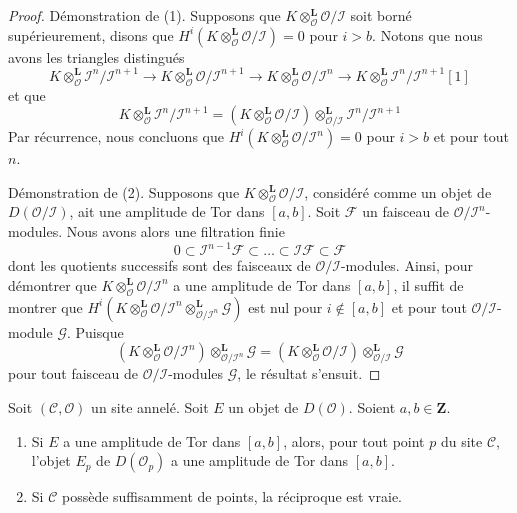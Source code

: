 \begin{proof}
Démonstration de (1). Supposons que
$K \otimes_\mathcal{O}^\mathbf{L} \mathcal{O}/\mathcal{I}$
soit borné supérieurement, disons que
$H^i(K \otimes_\mathcal{O}^\mathbf{L} \mathcal{O}/\mathcal{I}) = 0$
pour $i > b$. Notons que nous avons les triangles distingués
$$
K \otimes_\mathcal{O}^\mathbf{L}
\mathcal{I}^n/\mathcal{I}^{n + 1} \to
K \otimes_\mathcal{O}^\mathbf{L}
\mathcal{O}/\mathcal{I}^{n + 1} \to
K \otimes_\mathcal{O}^\mathbf{L}
\mathcal{O}/\mathcal{I}^n \to
K \otimes_\mathcal{O}^\mathbf{L}
\mathcal{I}^n/\mathcal{I}^{n + 1}[1]
$$
et que
$$
K \otimes_\mathcal{O}^\mathbf{L}
\mathcal{I}^n/\mathcal{I}^{n + 1} =
\left(
K \otimes_\mathcal{O}^\mathbf{L}
\mathcal{O}/\mathcal{I}\right)
\otimes_{\mathcal{O}/\mathcal{I}}^\mathbf{L}
\mathcal{I}^n/\mathcal{I}^{n + 1}
$$
Par récurrence, nous concluons que
$H^i(K \otimes_\mathcal{O}^\mathbf{L} \mathcal{O}/\mathcal{I}^n) = 0$
pour $i > b$ et pour tout $n$.

\medskip\noindent
Démonstration de (2). Supposons que
$K \otimes_\mathcal{O}^\mathbf{L} \mathcal{O}/\mathcal{I}$, considéré comme
un objet de $D(\mathcal{O}/\mathcal{I})$, ait une amplitude de Tor dans
$[a, b]$. Soit $\mathcal{F}$ un faisceau de
$\mathcal{O}/\mathcal{I}^n$-modules. Nous avons alors une filtration finie
$$
0 \subset \mathcal{I}^{n - 1}\mathcal{F} \subset \ldots
\subset \mathcal{I}\mathcal{F} \subset \mathcal{F}
$$
dont les quotients successifs sont des faisceaux de
$\mathcal{O}/\mathcal{I}$-modules. Ainsi, pour démontrer que
$K \otimes_\mathcal{O}^\mathbf{L} \mathcal{O}/\mathcal{I}^n$ a une amplitude
de Tor dans $[a, b]$, il suffit de montrer que
$H^i(K \otimes_\mathcal{O}^\mathbf{L} \mathcal{O}/\mathcal{I}^n
\otimes_{\mathcal{O}/\mathcal{I}^n}^\mathbf{L} \mathcal{G})$
est nul pour $i \not \in [a, b]$ et pour tout
$\mathcal{O}/\mathcal{I}$-module $\mathcal{G}$. Puisque
$$
\left(K \otimes_\mathcal{O}^\mathbf{L} \mathcal{O}/\mathcal{I}^n\right)
\otimes_{\mathcal{O}/\mathcal{I}^n}^\mathbf{L} \mathcal{G}
=
\left(K \otimes_\mathcal{O}^\mathbf{L} \mathcal{O}/\mathcal{I}\right)
\otimes_{\mathcal{O}/\mathcal{I}}^\mathbf{L} \mathcal{G}
$$
pour tout faisceau de $\mathcal{O}/\mathcal{I}$-modules $\mathcal{G}$, le
résultat s'ensuit.
\end{proof}

\begin{lemma}
\label{lemma-tor-amplitude-stalk}
Soit $(\mathcal{C}, \mathcal{O})$ un site annelé. Soit $E$ un objet de
$D(\mathcal{O})$. Soient $a, b \in \mathbf{Z}$.
\begin{enumerate}
\item Si $E$ a une amplitude de Tor dans $[a, b]$, alors, pour tout point
$p$ du site $\mathcal{C}$, l'objet $E_p$ de $D(\mathcal{O}_p)$ a une amplitude
de Tor dans $[a, b]$.
\item Si $\mathcal{C}$ possède suffisamment de points, la réciproque est
vraie.
\end{enumerate}
\end{lemma}

